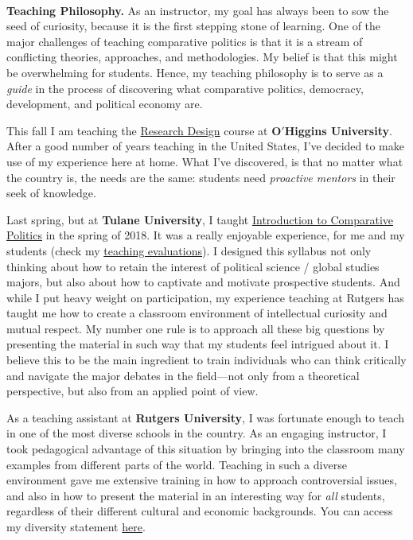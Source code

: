 \vspace{-2cm}{\bf \huge Teaching Statement}\\

{\bf Teaching Philosophy.} As an instructor, my goal has always been to sow the seed of curiosity, because it is the first stepping stone of learning. One of the major challenges of teaching comparative politics is that it is a stream of conflicting theories, approaches, and methodologies. My belief is that this might be overwhelming for students. Hence, my teaching philosophy is to serve as a \emph{guide} in the process of discovering what comparative politics, democracy, development, and political economy are.

This fall I am teaching the \href{https://github.com/hbahamonde/Social_Sciences_Epistemology_UGRAD/raw/master/Bahamonde_Social_Sciences_Epistemology_UGRAD_Syllabus.pdf}{Research Design} course  at {\bf O$'$Higgins University}. After a good number of years teaching in the United States, I've decided to make use of my experience here at home. What I've discovered, is that no matter what the country is, the needs are the same: students need \emph{proactive mentors} in their seek of knowledge. 

Last spring, but at {\bf Tulane University}, I taught \href{https://github.com/hbahamonde/Comparative_Politics_UGRAD/raw/master/Bahamonde_Comparative_Politics_Syllabus_UGRAD.pdf}{Introduction to Comparative Politics} in the spring of 2018. It was a really enjoyable experience, for me and my students (check my \href{https://github.com/hbahamonde/Job_Market/raw/master/Bahamonde_Research_Portafolio.pdf}{teaching evaluations}). I designed this syllabus not only thinking about how to retain the interest of political science / global studies majors, but also about how to captivate and motivate prospective students. And while I put heavy weight on participation, my experience teaching at Rutgers has taught me how to create a classroom environment of intellectual curiosity and mutual respect. My number one rule is to approach all these big questions by presenting the material in such way that my students feel intrigued about it. I believe this to be the main ingredient to train individuals who can think critically and navigate the major debates in the field---not only from a theoretical perspective, but also from an applied point of view.

As a teaching assistant at {\bf Rutgers University}, I was fortunate enough to teach in one of the most diverse schools in the country. As an engaging instructor, I took pedagogical advantage of this situation by bringing into the classroom many examples from different parts of the world. Teaching in such a diverse environment gave me extensive training in how to approach controversial issues, and also in how to present the material in an interesting way for \emph{all} students, regardless of their different cultural and economic backgrounds. You can access my diversity statement \href{http://github.com/hbahamonde/Job_Market/raw/master/Bahamonde_Diversity_Statement.pdf}{here}.



